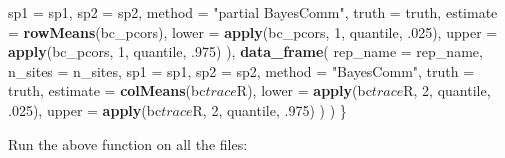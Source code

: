 \documentclass[11pt,]{article}
\newenvironment{Shaded}{\begin{snugshade}}{\end{snugshade}}
\newcommand{\KeywordTok}[1]{\textcolor[rgb]{0.13,0.29,0.53}{\textbf{{#1}}}}
\newcommand{\DataTypeTok}[1]{\textcolor[rgb]{0.13,0.29,0.53}{{#1}}}
\newcommand{\DecValTok}[1]{\textcolor[rgb]{0.00,0.00,0.81}{{#1}}}
\newcommand{\CharTok}[1]{\textcolor[rgb]{0.31,0.60,0.02}{{#1}}}
\newcommand{\StringTok}[1]{\textcolor[rgb]{0.31,0.60,0.02}{{#1}}}
\newcommand{\CommentTok}[1]{\textcolor[rgb]{0.56,0.35,0.01}{\textit{{#1}}}}
\newcommand{\OtherTok}[1]{\textcolor[rgb]{0.56,0.35,0.01}{{#1}}}
\newcommand{\NormalTok}[1]{{#1}}
\begin{document}
\begin{Shaded}
\begin{Highlighting}[]
      \DataTypeTok{sp1 =} \NormalTok{sp1,}
      \DataTypeTok{sp2 =} \NormalTok{sp2,}
      \DataTypeTok{method =} \StringTok{"partial BayesComm"}\NormalTok{,}
      \DataTypeTok{truth =} \NormalTok{truth,}
      \DataTypeTok{estimate =} \KeywordTok{rowMeans}\NormalTok{(bc_pcors),}
      \DataTypeTok{lower =} \KeywordTok{apply}\NormalTok{(bc_pcors, }\DecValTok{1}\NormalTok{, quantile, .}\DecValTok{025}\NormalTok{),}
      \DataTypeTok{upper =} \KeywordTok{apply}\NormalTok{(bc_pcors, }\DecValTok{1}\NormalTok{, quantile, .}\DecValTok{975}\NormalTok{)}
    \NormalTok{),}
    \KeywordTok{data_frame}\NormalTok{(}
      \DataTypeTok{rep_name =} \NormalTok{rep_name,}
      \DataTypeTok{n_sites =} \NormalTok{n_sites,}
      \DataTypeTok{sp1 =} \NormalTok{sp1,}
      \DataTypeTok{sp2 =} \NormalTok{sp2,}
      \DataTypeTok{method =} \StringTok{"BayesComm"}\NormalTok{,}
      \DataTypeTok{truth =} \NormalTok{truth,}
      \DataTypeTok{estimate =} \KeywordTok{colMeans}\NormalTok{(bc$trace$R),}
      \DataTypeTok{lower =} \KeywordTok{apply}\NormalTok{(bc$trace$R, }\DecValTok{2}\NormalTok{, quantile, .}\DecValTok{025}\NormalTok{),}
      \DataTypeTok{upper =} \KeywordTok{apply}\NormalTok{(bc$trace$R, }\DecValTok{2}\NormalTok{, quantile, .}\DecValTok{975}\NormalTok{)}
    \NormalTok{)}
  \NormalTok{)}
\NormalTok{\}}
\end{Highlighting}
\end{Shaded}

Run the above function on all the files:

\begin{Shaded}
\end{Shaded}

\begin{Shaded}
\end{Shaded}
\end{document}
